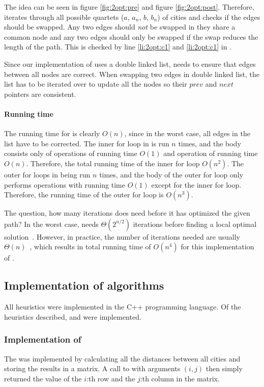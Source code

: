 The idea can be seen in figure \ref{fig:2opt:pre} and figure
\ref{fig:2opt:post}. Therefore,  iterates through all possible
quartets ($a$, $a_n$, $b$, $b_n$) of cities and checks if the edges should be
swapped. Any two edges should \emph{not} be swapped in they share a common
node and any two edges should only be swapped if the swap reduces the length of
the path. This is checked by line \ref{li:2opt:c1} and \ref{li:2opt:c1} in
.

Since our implementation of  uses a double linked list,
 needs to ensure that edges between all nodes are correct. When
swapping two edges in double linked list, the list has to be iterated over to 
update all the nodes so their $prev$ and $next$ pointers are consistent.

\paragraph{Running time}
The running time for  is clearly $O(n)$, since in the worst case,
all edges in the list have to be corrected. The inner for loop in 
is run $n$ times, and the body consists only of operations of running time
$O(1)$ and  operation of running time $O(n)$. Therefore, the total
running time of the inner for loop $O(n^2)$. The outer for loops in being run
$n$ times, and the body of the outer for loop only performs operations with
running time $O(1)$ except for the inner for loop. Therefore, the running time
of the outer for loop is $O(n^3)$.

The question, how many iterations does  need before it has
optimized the given path? In the worst case,  needs
$\Theta(2^{n/2})$ iterations before finding a local optimal
solution~\cite{johnson}. However, in practice, the number of iterations needed
are usually $\Theta(n)$~\cite{hastad}, which results in total running time of
$O(n^4)$ for this implementation of .

\subsection{Implementation of algorithms}
\label{sec:implementation_of_algorithms}
All heuristics were implemented in the C++ programming language. Of the
heuristics described,  and  were
implemented.

\subsubsection{Implementation of }
The  was implemented by calculating all the distances between
all cities and storing the results in a matrix. A call to  with
arguments $(i, j)$ then simply returned the value of the $i$:th row and the
$j$:th column in the matrix.

